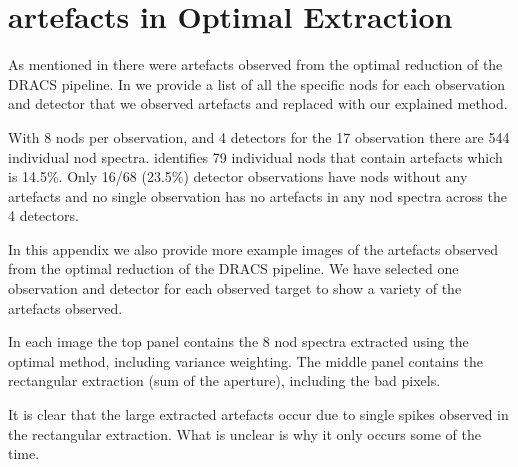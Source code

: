 
\chapter{artefacts in Optimal Extraction} %
\label{appendix:artefacts}



As mentioned in  there were artefacts observed from the optimal reduction of the DRACS pipeline. In  we provide a list of all the specific nods for each observation and detector that we observed artefacts and replaced with our explained method.  

With 8 nods per observation, and 4 detectors for the 17 observation there are 544 individual nod spectra.  identifies 79 individual nods that contain artefacts which is 14.5\%.   Only 16/68 (23.5\%) detector observations have nods without any artefacts and no single observation has no artefacts in any nod spectra across the 4 detectors.


In this appendix we also provide more example images of the artefacts observed from the optimal reduction of the DRACS pipeline. We have selected one observation and detector for each observed target to show a variety of the artefacts observed.

In each image the top panel contains the 8 nod spectra extracted using the optimal method, including variance weighting. The middle panel contains the rectangular extraction (sum of the aperture), including the bad pixels.

It is clear that the large extracted artefacts occur due to single spikes observed in the rectangular extraction. What is unclear is why it only occurs some of the time.
 

 
